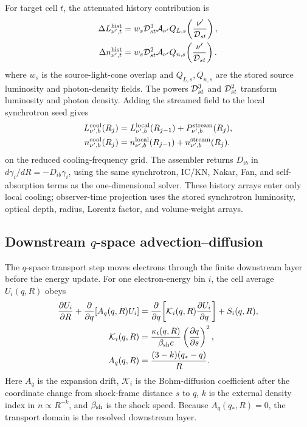 \documentclass[twocolumn]{aastex702}
\begin{document}
For target cell \(t\), the attenuated history contribution is
\begin{equation}
\begin{aligned}
\Delta L_{\nu',t}^{\rm hist}
&=w_s{\cal D}_{st}^3
{\cal A}_{\nu'} Q_{L,s}\!\left(\frac{\nu'}{{\cal D}_{st}}\right),\\
\Delta n_{\nu',t}^{\rm hist}
&=w_s{\cal D}_{st}^2
{\cal A}_{\nu'} Q_{n,s}\!\left(\frac{\nu'}{{\cal D}_{st}}\right).
\end{aligned}
\end{equation}
where \(w_s\) is the source-light-cone overlap and \(Q_{L,s},Q_{n,s}\) are the
stored source luminosity and photon-density fields.  The powers
\({\cal D}_{st}^3\) and \({\cal D}_{st}^2\) transform luminosity and photon
density.  Adding the streamed field to the local synchrotron seed gives
\begin{equation}
\begin{aligned}
L_{\nu',b}^{\rm cool}(R_j)
&=L_{\nu',b}^{\rm local}(R_{j-1})
+P_{\nu',b}^{\rm stream}(R_j),\\
n_{\nu',b}^{\rm cool}(R_j)
&=n_{\nu',b}^{\rm local}(R_{j-1})
+n_{\nu',b}^{\rm stream}(R_j).
\end{aligned}
\end{equation}
on the reduced cooling-frequency grid.  The assembler returns \(D_{ib}\) in
\(d\gamma_i/dR=-D_{ib}\gamma_i\), using the same synchrotron, IC/KN, Nakar, Fan,
and self-absorption terms as the one-dimensional solver.  These history arrays
enter only local cooling; observer-time projection uses the stored synchrotron
luminosity, optical depth, radius, Lorentz factor, and volume-weight arrays.

\subsection{Downstream \texorpdfstring{\(q\)}{q}-space advection--diffusion}

The \(q\)-space transport step moves electrons through the finite downstream
layer before the energy update.  For one electron-energy bin \(i\), the cell
average \(U_i(q,R)\) obeys
\begin{equation}
\begin{aligned}
\frac{\partial U_i}{\partial R}
+\frac{\partial}{\partial q}\!\left[A_q(q,R)U_i\right]
&=
\frac{\partial}{\partial q}\!\left[
\mathcal K_i(q,R)\frac{\partial U_i}{\partial q}
\right]
+S_i(q,R),\\
\mathcal K_i(q,R)
&=\frac{\kappa_i(q,R)}{\beta_{\rm sh}c}
\left(\frac{\partial q}{\partial s}\right)^2,\\
A_q(q,R)&=\frac{(3-k)(q_\ast-q)}{R}.
\end{aligned}
\end{equation}
Here \(A_q\) is the expansion drift, \(\mathcal K_i\) is the Bohm-diffusion
coefficient after the coordinate change from shock-frame distance \(s\) to \(q\),
\(k\) is the external density index in \(n\propto R^{-k}\), and
\(\beta_{\rm sh}\) is the shock speed.  Because \(A_q(q_\ast,R)=0\), the
transport domain is the resolved downstream layer.
\end{document}

